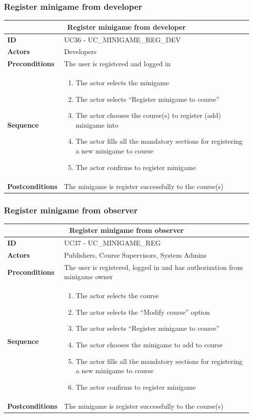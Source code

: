 \subsubsection{Register minigame from developer}
\begin{tabular}{|m{2.5cm}|m{8cm}|}
	\hline
	\multicolumn{2}{|c|}{Register minigame from developer} \\
	\hline
	\textbf{ID} & UC36 - UC\_MINIGAME\_REG\_DEV \\
	\hline
	\textbf{Actors} & Developers \\
	\hline
	\textbf{Preconditions} & The user is registered and logged in \\
	\hline
	\textbf{Sequence} & 
	\begin{enumerate}
		\item The actor selects the minigame
		\item The actor selects “Register minigame to course”
		\item The actor chooses the course(s) to register (add) minigame into
		\item The actor fills all the mandatory sections for registering a new minigame to course
		\item The actor confirms to register minigame
	\end{enumerate} \\
	\hline
	\textbf{Postconditions} & The minigame is register successfully to the course(s) \\
	\hline
\end{tabular}

\subsubsection{Register minigame from observer}
\begin{tabular}{|m{2.5cm}|m{8cm}|}
	\hline
	\multicolumn{2}{|c|}{Register minigame from observer} \\
	\hline
	\textbf{ID} & UC37 - UC\_MINIGAME\_REG \\
	\hline
	\textbf{Actors} & Publishers, Course Supervisors, System Admins \\
	\hline
	\textbf{Preconditions} & The user is registered, logged in and has authorization from minigame owner \\
	\hline
	\textbf{Sequence} & 
	\begin{enumerate}
		\item The actor selects the course
		\item The actor selects the “Modify course” option
		\item The actor selects “Register minigame to course”
		\item The actor chooses the minigame to add to course
		\item The actor fills all the mandatory sections for registering a new minigame to course
		\item The actor confirms to register minigame
	\end{enumerate} \\
	\hline
	\textbf{Postconditions} & The minigame is register successfully to the course(s) \\
	\hline
\end{tabular}

